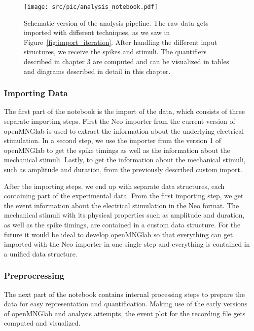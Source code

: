 \begin{figure}
	\texttt{[image: src/pic/analysis\_notebook.pdf]}
	\caption{Schematic version of the analysis pipeline. The raw data gets imported with different techniques, as we saw in Figure~\ref{fig:import_iteration}. After handling the different input structures, we receive the spikes and stimuli. The quantifiers described in chapter 3 are computed and can be visualized in tables and diagrams described in detail in this chapter.}
	\label{fig:analysis_notebook}
\end{figure}
\subsubsection{Importing Data}
The first part of the notebook is the import of the data, which consists of three separate importing steps.
First the Neo importer from the current version of openMNGlab is used to extract the information about the underlying electrical stimulation. In a second step, we use the importer from the version 1 of openMNGlab to get the spike timings as well as the information about the mechanical stimuli. Lastly, to get the information about the mechanical stimuli, such as amplitude and duration, from the previously described custom import.

After the importing steps, we end up with separate data structures, each containing part of the experimental data. From the first importing step, we get the event information about the electrical stimulation in the Neo format. The mechanical stimuli with its physical properties such as amplitude and duration, as well as the spike timings, are contained in a custom data structure. For the future it would be ideal to develop openMNGlab so that everything can get imported with the Neo importer in one single step and everything is contained in a unified data structure.

\subsubsection{Preprocressing}
The next part of the notebook contains internal processing steps to prepare the data for easy representation and quantification. Making use of the early versions of openMNGlab and analysis attempts, the event plot for the recording file gets computed and visualized. 

